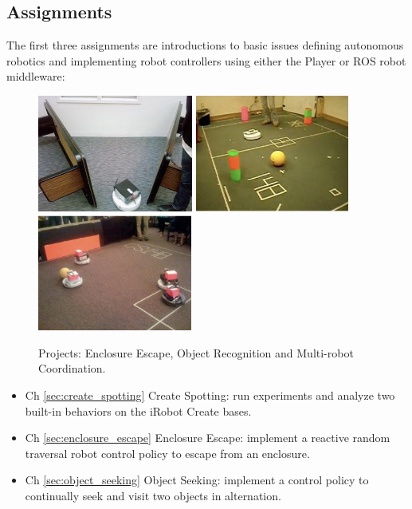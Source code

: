 \subsection{Assignments}

The first three assignments are introductions to basic issues defining autonomous robotics and implementing robot controllers using either the Player or ROS robot middleware:

\begin{figure}
\centerline{
\mbox{\includegraphics[width=2.01in]{figures/1_enclosure.jpg}}
\mbox{\includegraphics[width=1.99in]{figures/1_objrec.jpg}}
\mbox{\includegraphics[width=2.0in]{figures/1_multi.jpg}}
}
\caption{Projects: Enclosure Escape, Object Recognition and Multi-robot Coordination.}
\end{figure}

\begin{itemize}
\item Ch \ref{sec:create_spotting} Create Spotting: run experiments and analyze two built-in behaviors on the iRobot Create bases.
\item Ch \ref{sec:enclosure_escape} Enclosure Escape: implement a reactive random traversal robot control policy to escape from an enclosure.
\item Ch \ref{sec:object_seeking} Object Seeking: implement a control policy to continually seek and visit two objects in alternation.
\end{itemize}

